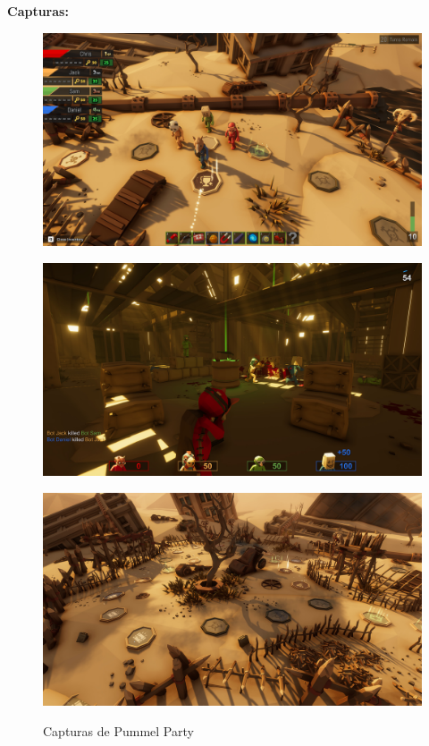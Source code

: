\textbf{Capturas:}
\begin{figure}[H]
    \centering
    \begin{minipage}{0.40\textwidth}
        \centering
        \includegraphics[width=1.0\textwidth]{Cuerpo/4/PMP1.jpg} %
        \label{PMP-Tablero}
    \end{minipage}\hfill
    \begin{minipage}{0.40\textwidth}
        \centering
        \includegraphics[width=1.0\textwidth]{Cuerpo/4/PMP2.jpg} %
        \label{PMP-Shooter}
    \end{minipage}
    \centering
    \begin{minipage}{0.40\textwidth}
        \centering
        \includegraphics[width=1.0\textwidth]{Cuerpo/4/PMP3.jpg} %
        \label{PMP-Paisaje}
    \end{minipage}
    \caption{Capturas de Pummel Party}
\end{figure}

